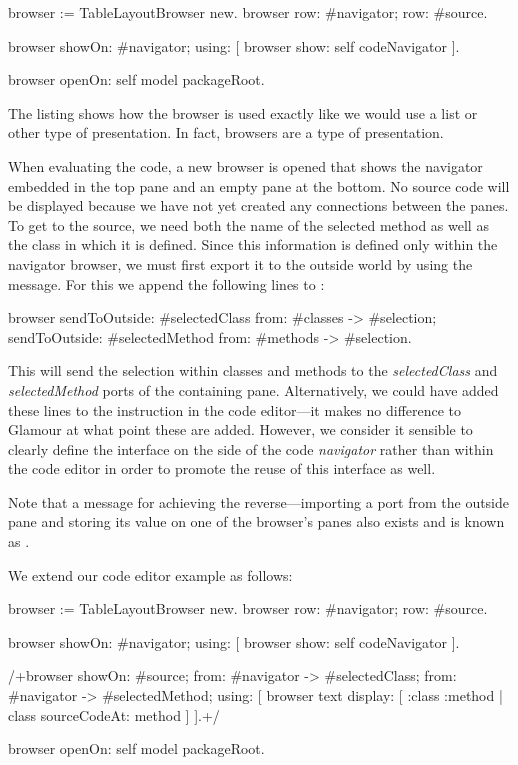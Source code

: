 \documentclass[a4paper,10pt,twoside]{book}
\begin{document}
\begin{code}{}
browser := TableLayoutBrowser new.
browser
	row: #navigator;
	row: #source.

browser showOn: #navigator; using: [
	browser show: self codeNavigator
].

browser openOn: self model packageRoot.
\end{code}

The listing shows how the browser is used exactly like we would use a list or other type of presentation. In fact, browsers are a type of presentation.

When evaluating the code, a new browser is opened that shows the navigator embedded in the top pane and an empty pane at the bottom. No source code will be displayed because we have not yet created any connections between the panes. To get to the source, we need both the name of the selected method as well as the class in which it is defined. Since this information is defined only within the navigator browser, we must first export it to the outside world by using the  message. For this we append the following lines to :

\begin{code}{}
browser
	sendToOutside: #selectedClass from: #classes -> #selection;
	sendToOutside: #selectedMethod from: #methods -> #selection.
\end{code}

This will send the selection within classes and methods to the \emph{selectedClass} and \emph{selectedMethod} ports of the containing pane. Alternatively, we could have added these lines to the  instruction in the code editor---it makes no difference to Glamour at what point these are added. However, we consider it sensible to clearly define the interface on the side of the code \emph{navigator} rather than within the code editor in order to promote the reuse of this interface as well.

Note that a message for achieving the reverse---importing a port from the outside pane and storing its value on one of the browser’s panes also exists and is known as .

We extend our code editor example as follows:

\begin{code}{}
browser := TableLayoutBrowser new.
browser
	row: #navigator;
	row: #source.

browser showOn: #navigator; using: [
	browser show: self codeNavigator
].

/+browser
	showOn: #source;
	from: #navigator -> #selectedClass;
	from: #navigator -> #selectedMethod; using: [
	browser text
		display: [ :class :method | class sourceCodeAt: method ]
].+/

browser openOn: self model packageRoot.
\end{code}
\end{document}
